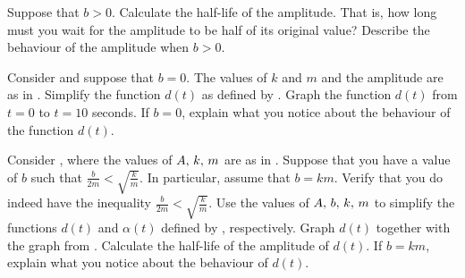 \documentclass[a4paper,oneside,12pt]{article}
\begin{document}
\begin{problem}
\begin{packedenum}
  \item\label{subprob:trigonometric:damped_amplitude_halflife}
    Suppose that $b > 0$.  Calculate the half-life of the amplitude.
    That is, how long must you wait for the amplitude to be half of
    its original value?  Describe the behaviour of the amplitude when
    $b > 0$.

  \item\label{subprob:trigonometric:damped_no_friction}
    Consider
    and suppose that $b = 0$.  The values of $k$ and $m$ and the
    amplitude are as
    in .  Simplify the
    function $d(t)$ as defined by
    .  Graph the function
    $d(t)$ from $t = 0$ to $t = 10$ seconds.  If $b = 0$, explain what
    you notice about the behaviour of the function $d(t)$.

  \item\label{subprob:trigonometric:damped_underdamped}
    Consider
    ,
    where the values of ${A},\, {k},\, {m}$ are as
    in .  Suppose that
    you have a value of $b$ such that
    $\frac{b}{2m} < \sqrt{\frac{k}{m}}$.  In particular, assume that
    $b = km$.  Verify that you do indeed have the inequality
    $\frac{b}{2m} < \sqrt{\frac{k}{m}}$.  Use the values of
    ${A},\, {b},\, {k},\, {m}$ to simplify the functions $d(t)$ and
    $\alpha(t)$ defined by
    ,
    respectively.  Graph $d(t)$ together with the graph
    from .  Calculate
    the half-life of the amplitude of $d(t)$.  If $b = km$, explain
    what you notice about the behaviour of $d(t)$.


\end{packedenum}
\end{problem}
\end{document}
